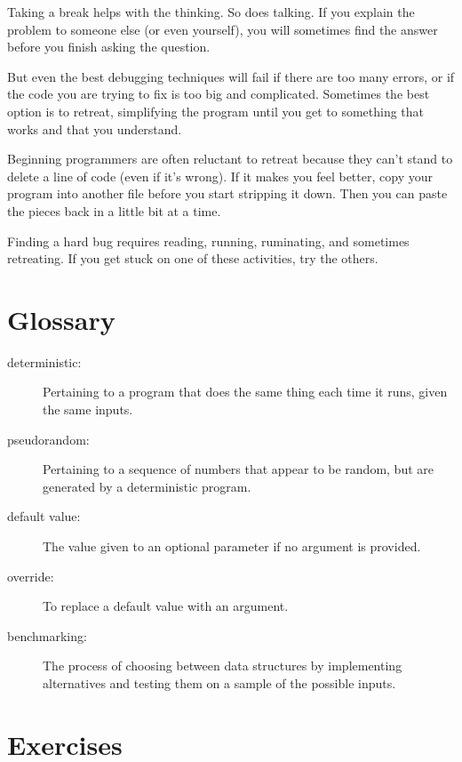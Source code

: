 \documentclass[10pt]{book}
\begin{document}
Taking a break helps with the thinking.  So does talking.
If you explain the problem to someone else (or even yourself), you
will sometimes find the answer before you finish asking the question.

But even the best debugging techniques will fail if there are too many
errors, or if the code you are trying to fix is too big and
complicated.  Sometimes the best option is to retreat, simplifying the
program until you get to something that works and that you
understand.

Beginning programmers are often reluctant to retreat because
they can't stand to delete a line of code (even if it's wrong).
If it makes you feel better, copy your program into another file
before you start stripping it down.  Then you can paste the pieces
back in a little bit at a time.

Finding a hard bug requires reading, running, ruminating, and
sometimes retreating.  If you get stuck on one of these activities,
try the others.


\section{Glossary}

\begin{description}

\item[deterministic:] Pertaining to a program that does the same
thing each time it runs, given the same inputs.

\item[pseudorandom:] Pertaining to a sequence of numbers that appear
to be random, but are generated by a deterministic program.

\item[default value:] The value given to an optional parameter if no
argument is provided.

\item[override:] To replace a default value with an argument.

\item[benchmarking:] The process of choosing between data structures
by implementing alternatives and testing them on a sample of the
possible inputs.  

\end{description}


\section{Exercises}
\end{document}
